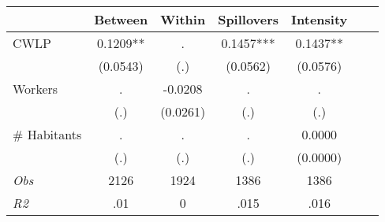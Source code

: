 \begin{tabular}{l*{6}{c}}\hline&\multicolumn{1}{c}{Between}&\multicolumn{1}{c}{Within}&\multicolumn{1}{c}{Spillovers}&\multicolumn{1}{c}{Intensity}\\ \hline 
CWLP & 0.1209** & . & 0.1457*** & 0.1437** \\
 & (0.0543) & (.) & (0.0562) & (0.0576) \\
Workers & . & -0.0208 & . & . \\
 & (.) & (0.0261) & (.) & (.) \\
\# Habitants & . & . & . & 0.0000 \\
  & (.) & (.) & (.) & (0.0000) \\
\hline \textit{Obs} & 2126 & 1924 & 1386 & 1386  \\ \textit{R2} & .01 & 0 & .015 & .016 \\ \hline \end{tabular}
